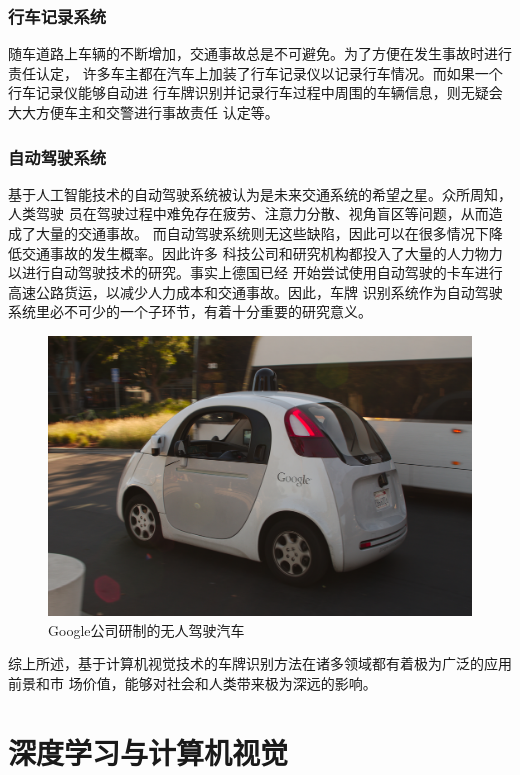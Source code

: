 \subsubsection{行车记录系统}

随车道路上车辆的不断增加，交通事故总是不可避免。为了方便在发生事故时进行责任认定，
许多车主都在汽车上加装了行车记录仪以记录行车情况。而如果一个行车记录仪能够自动进
行车牌识别并记录行车过程中周围的车辆信息，则无疑会大大方便车主和交警进行事故责任
认定等。

\subsubsection{自动驾驶系统}

基于人工智能技术的自动驾驶系统被认为是未来交通系统的希望之星。众所周知，人类驾驶
员在驾驶过程中难免存在疲劳、注意力分散、视角盲区等问题，从而造成了大量的交通事故。
而自动驾驶系统则无这些缺陷，因此可以在很多情况下降低交通事故的发生概率。因此许多
科技公司和研究机构都投入了大量的人力物力以进行自动驾驶技术的研究。事实上德国已经
开始尝试使用自动驾驶的卡车进行高速公路货运，以减少人力成本和交通事故。因此，车牌
识别系统作为自动驾驶系统里必不可少的一个子环节，有着十分重要的研究意义。

\begin{figure}[ht]
  \centering
  \includegraphics[width=1.0\linewidth]{./Figure/GoogleSelfDrivingCar.jpg}
  \caption{Google公司研制的无人驾驶汽车}
\end{figure}

综上所述，基于计算机视觉技术的车牌识别方法在诸多领域都有着极为广泛的应用前景和市
场价值，能够对社会和人类带来极为深远的影响。

\section{深度学习与计算机视觉}
